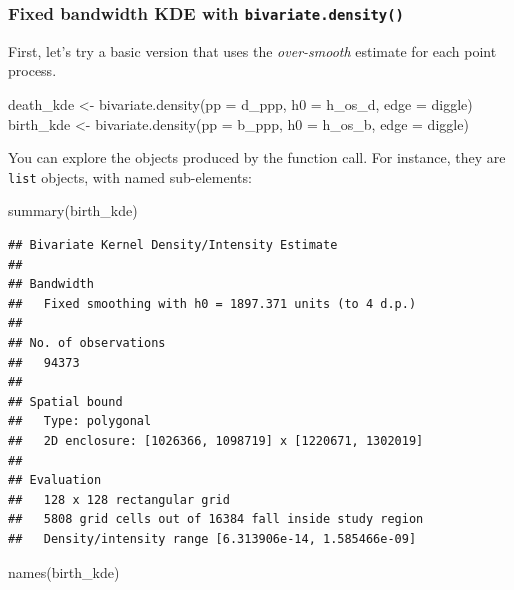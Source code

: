 \documentclass[
]{book}
\newenvironment{Shaded}{\begin{snugshade}}{\end{snugshade}}
\newcommand{\AttributeTok}[1]{\textcolor[rgb]{0.77,0.63,0.00}{#1}}
\newcommand{\FunctionTok}[1]{\textcolor[rgb]{0.00,0.00,0.00}{#1}}
\newcommand{\NormalTok}[1]{#1}
\newcommand{\OtherTok}[1]{\textcolor[rgb]{0.56,0.35,0.01}{#1}}
\newcommand{\StringTok}[1]{\textcolor[rgb]{0.31,0.60,0.02}{#1}}
\begin{document}
\hypertarget{fixed-bandwidth-kde-with-bivariate.density}{%
\subsubsection{\texorpdfstring{Fixed bandwidth KDE with \texttt{bivariate.density()}}{Fixed bandwidth KDE with bivariate.density()}}\label{fixed-bandwidth-kde-with-bivariate.density}}

First, let's try a basic version that uses the \emph{over-smooth} estimate for each point process.

\begin{Shaded}
\begin{Highlighting}[]
\NormalTok{death\_kde }\OtherTok{\textless{}{-}} \FunctionTok{bivariate.density}\NormalTok{(}\AttributeTok{pp =}\NormalTok{ d\_ppp, }\AttributeTok{h0 =}\NormalTok{ h\_os\_d, }\AttributeTok{edge =} \StringTok{\textquotesingle{}diggle\textquotesingle{}}\NormalTok{)}
\NormalTok{birth\_kde }\OtherTok{\textless{}{-}} \FunctionTok{bivariate.density}\NormalTok{(}\AttributeTok{pp =}\NormalTok{ b\_ppp, }\AttributeTok{h0 =}\NormalTok{ h\_os\_b, }\AttributeTok{edge =} \StringTok{\textquotesingle{}diggle\textquotesingle{}}\NormalTok{)}
\end{Highlighting}
\end{Shaded}

You can explore the objects produced by the function call. For instance, they are \texttt{list} objects, with named sub-elements:

\begin{Shaded}
\begin{Highlighting}[]
\FunctionTok{summary}\NormalTok{(birth\_kde)}
\end{Highlighting}
\end{Shaded}

\begin{verbatim}
## Bivariate Kernel Density/Intensity Estimate
## 
## Bandwidth
##   Fixed smoothing with h0 = 1897.371 units (to 4 d.p.)
## 
## No. of observations
##   94373 
## 
## Spatial bound
##   Type: polygonal
##   2D enclosure: [1026366, 1098719] x [1220671, 1302019]
## 
## Evaluation
##   128 x 128 rectangular grid
##   5808 grid cells out of 16384 fall inside study region
##   Density/intensity range [6.313906e-14, 1.585466e-09]
\end{verbatim}

\begin{Shaded}
\begin{Highlighting}[]
\FunctionTok{names}\NormalTok{(birth\_kde)}
\end{Highlighting}
\end{Shaded}
\end{document}
